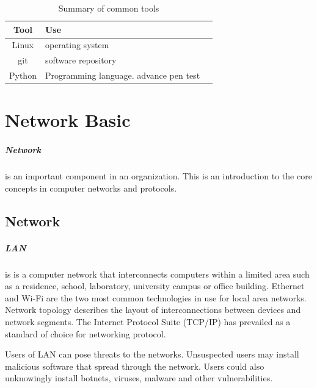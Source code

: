 \documentclass[7x9]{times}
\begin{document}
\begin{table}[]
    \begin{tabular}{|c|l|c|}
        \hline 
        Tool & Use &  \\ 
        \hline 
        Linux & operating system &  \\ 
        \hline 
        git & software repository &  \\ 
        \hline 
        Python & Programming language. advance pen test &  \\ 
        \hline 
    \end{tabular}
    \caption{Summary of common tools}
    \label{tab:tools}
\end{table}



\chapternotes
 

\chapter{Network Basic}


\paragraph{Network} is an important component in an 
organization. This is an introduction to the core concepts 
in computer networks and protocols.

\section{Network}

\paragraph{LAN} is is a computer network that interconnects
computers within a limited area such as a residence, school,
laboratory, university campus or office building. Ethernet
and Wi-Fi are the two most common technologies in use for
local area networks. Network topology describes the layout
of interconnections between devices and network segments.
The Internet Protocol Suite (TCP/IP) has prevailed as a
standard of choice for networking protocol.


Users of LAN can pose threats to the networks. Unsuspected
users may install malicious software that spread through the
network. Users could also unknowingly install botnets, 
viruses, 
malware and other vulnerabilities.
\end{document}
